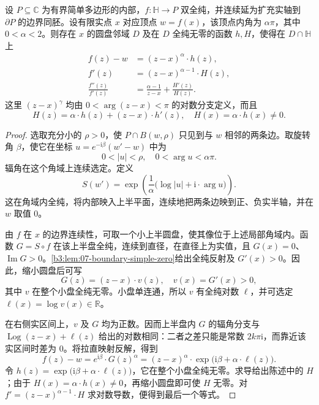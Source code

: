 \begin{proposition}[多边形角点的局部因子]\label{b3:prop:07-corner-factorization}
设 \(P\subseteq\mathbb C\) 为有界简单多边形的内部，\(f:\mathbb H\rightarrow P\) 双全纯，并连续延为扩充实轴到 \(\partial P\) 的边界同胚。设有限实点 \(x\) 对应顶点 \(w=f(x)\)，该顶点内角为 \(\alpha\pi\)，其中 \(0<\alpha<2\)。则存在 \(x\) 的圆盘邻域 \(D\) 及在 \(D\) 全纯无零的函数 \(h,H\)，使得在 \(D\cap\mathbb H\) 上
\[
 \begin{aligned}
 f(z)-w&=(z-x)^\alpha\cdot h(z),\\
 f'(z)&=(z-x)^{\alpha-1}\cdot H(z),\\
 \frac{f''(z)}{f'(z)}
 &=\frac{\alpha-1}{z-x}+\frac{H'(z)}{H(z)}.
 \end{aligned}
\]
这里 \((z-x)^\gamma\) 均由 \(0<\arg(z-x)<\pi\) 的对数分支定义，而且
\[
 H(z)=\alpha\cdot h(z)+(z-x)\cdot h'(z),\quad
 H(x)=\alpha\cdot h(x)\ne0.
\]
\end{proposition}
\begin{proof}
选取充分小的 \(\rho>0\)，使 \(P\cap B(w,\rho)\) 只见到与 \(w\) 相邻的两条边。取旋转角 \(\beta\)，使它在坐标 \(u=e^{-\mathrm{i}\beta}(w'-w)\) 中为
\[
 0<|u|<\rho,\quad 0<\arg u<\alpha\pi.
\]
辐角在这个角域上连续选定。定义
\[
 S(w')=\exp\left(\frac1\alpha
 \bigl(\log|u|+\mathrm{i}\cdot\arg u\bigr)\right).
\]
这在角域内全纯，将内部映入上半平面，连续地把两条边映到正、负实半轴，并在 \(w\) 取值 \(0\)。

由 \(f\) 在 \(x\) 的边界连续性，可取一个小上半圆盘，使其像位于上述局部角域内。函数 \(G=S\circ f\) 在该上半盘全纯，连续到直径，在直径上为实值，且 \(G(x)=0\)、\(\operatorname{Im}G>0\)。\cref{b3:lem:07-boundary-simple-zero}给出全纯反射及 \(G'(x)>0\)。因此，缩小圆盘后可写
\[
 G(z)=(z-x)\cdot v(z),\quad v(x)=G'(x)>0,
\]
其中 \(v\) 在整个小盘全纯无零。小盘单连通，所以 \(v\) 有全纯对数 \(\ell\)，并可选定 \(\ell(x)=\log v(x)\in\mathbb R\)。

在右侧实区间上，\(v\) 及 \(G\) 均为正数。因而上半盘内 \(G\) 的辐角分支与 \(\operatorname{Log}(z-x)+\ell(z)\) 给出的对数相同：二者之差只能是常数 \(2k\pi\mathrm{i}\)，而靠近该实区间时差为 \(0\)。将拉直映射反解，得到
\[
 f(z)-w=e^{\mathrm{i}\beta}\cdot G(z)^\alpha
 =(z-x)^\alpha\cdot
 \exp\bigl(\mathrm{i}\beta+\alpha\cdot\ell(z)\bigr).
\]
令 \(h(z)=\exp\bigl(\mathrm{i}\beta+\alpha\cdot\ell(z)\bigr)\)，它在整个小盘全纯无零。求导给出陈述中的 \(H\)；由于 \(H(x)=\alpha\cdot h(x)\ne0\)，再缩小圆盘即可使 \(H\) 无零。对 \(f'=(z-x)^{\alpha-1}\cdot H\) 求对数导数，便得到最后一个等式。
\end{proof}

